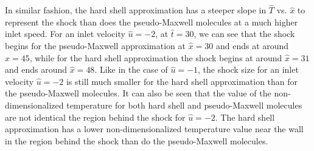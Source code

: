 \documentclass[a4paper]{article}
\begin{document}
In similar fashion, the hard shell approximation has a steeper slope in $\hat{T}$ vs. $\hat{x}$ to represent the shock than does the pseudo-Maxwell molecules at a much higher inlet speed. For an inlet velocity $\hat{u} = -2$, at $\hat{t} = 30$, we can see that the shock begins for the pseudo-Maxwell approximation at $\hat{x} = 30$ and ends at around $\hat{x} = 45$, while for the hard shell approximation the shock begins at around $\hat{x} = 31$ and ends around $\hat{x} = 48$. Like in the case of $\hat{u}=-1$, the shock size for an inlet velocity $\hat{u} = -2$ is still much smaller for the hard shell approximation than for the pseudo-Maxwell molecules. It can also be seen that the value of the non-dimensionalized temperature for both hard shell and pseudo-Maxwell molecules are not identical the region behind the shock for $\hat{u}=-2$. The hard shell approximation has a lower non-dimensionalized temperature value near the wall in the region behind the shock than do the pseudo-Maxwell molecules. 
\clearpage
\end{document}
